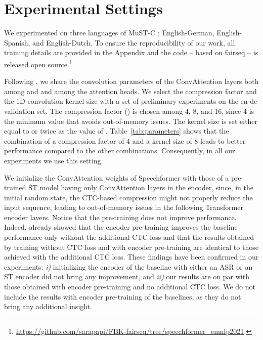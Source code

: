 \documentclass[11pt]{article}
\begin{document}
\section{Experimental Settings}

We experimented on three languages of MuST-C \cite{MuST-Cjournal}: English-German, English-Spanish, and English-Dutch. To ensure the reproducibility of our work, all training details are provided in the Appendix and the code -- based on fairseq \cite{ott-etal-2019-fairseq} -- is released open source.\footnote{\url{https://github.com/sarapapi/FBK-fairseq/tree/speechformer_emnlp2021}.}


Following \cite{wang2020linformer}, we share the convolution parameters of the ConvAttention layers both among  and  and among the attention heads.
We select the compression factor and the 1D convolution kernel size
with a set of preliminary experiments on the en-de validation set.  
The compression factor () is chosen among 4, 8, and 16, since 4 is the minimum value 
that avoids out-of-memory 
issues. The kernel size is set either equal to or twice as the value of .
Table~\ref{tab:parameters} shows that the combination of a compression factor of 4 and a kernel size of 8 leads to better performance compared to the other combinations. Consequently, in all our experiments we use this setting.


We initialize the ConvAttention weights of Speechformer with those of a pre-trained ST model having only ConvAttention layers in the encoder, since, in the initial random state, the CTC-based compression might not properly reduce the input sequence, leading to out-of-memory issues in the following Transformer encoder layers.
Notice that the pre-training does not improve performance. Indeed, \citet{gaido-etal-2021-ctc} already showed that the encoder pre-training improves the baseline performance only without the additional CTC loss and that the results obtained by training without  CTC loss and with encoder pre-training are identical to those achieved with the additional CTC loss.
These findings have been confirmed in our experiments: \textit{i)} initializing the encoder of the baseline with either an ASR or an ST encoder did not bring any improvement, and \textit{ii)} our results are on par with those obtained with encoder pre-training and no additional CTC loss. We do not include the results with encoder pre-training of the baselines, as they do not bring any additional insight.
\end{document}
